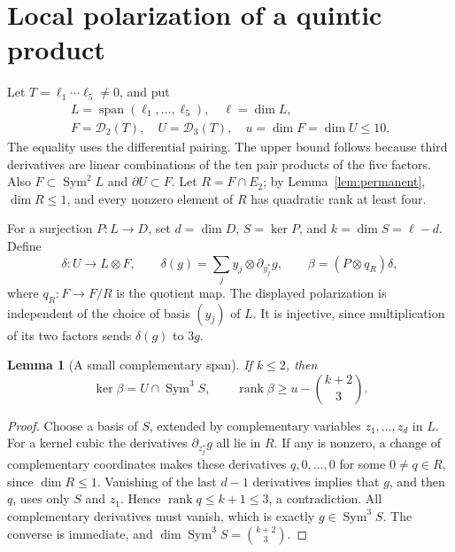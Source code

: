 \documentclass[11pt]{amsart}
\newtheorem{lemma}[theorem]{Lemma}
\theoremstyle{remark}
\numberwithin{equation}{section}
\newcommand{\Sym}{\operatorname{Sym}}
\newcommand{\Span}{\operatorname{span}}
\newcommand{\rank}{\operatorname{rank}}
\newcommand{\cD}{\mathcal D}
\newcommand{\dd}{\partial}
\begin{document}
\section{Local polarization of a quintic product}
Let \(T=\ell_1\cdots\ell_5\ne0\), and put
\[
 \begin{gathered}
 L=\Span(\ell_1,\ldots,\ell_5),\quad \ell=\dim L,\\
 F=\cD_2(T),\quad U=\cD_3(T),\quad u=\dim F=\dim U\le10.
 \end{gathered}
\]
The equality uses the differential pairing. The upper bound follows
because third derivatives are linear combinations of the ten pair
products of the five factors. Also \(F\subset\Sym^2L\) and
\(\dd U\subset F\). Let \(R=F\cap E_2\); by
Lemma~\ref{lem:permanent}, \(\dim R\le1\), and every nonzero element
of \(R\) has quadratic rank at least four.

For a surjection \(P:L\to D\), set \(d=\dim D\),
\(S=\ker P\), and \(k=\dim S=\ell-d\). Define
\[
 \delta:U\to L\otimes F,\qquad
 \delta(g)=\sum_j y_j\otimes\dd_{y_j^*}g,
 \qquad \beta=(P\otimes q_R)\delta,
\]
where \(q_R:F\to F/R\) is the quotient map. The displayed
polarization is independent of the choice of basis \((y_j)\) of \(L\).
It is injective, since multiplication of its two factors sends
\(\delta(g)\) to \(3g\).

\begin{lemma}[A small complementary span]\label{lem:kernel}
If \(k\le2\), then
\[
 \ker\beta=U\cap\Sym^3S,\qquad
 \rank\beta\ge u-\binom{k+2}{3}.
\]
\end{lemma}
\begin{proof}
Choose a basis of \(S\), extended by complementary variables
\(z_1,\ldots,z_d\) in \(L\). For a kernel cubic the derivatives
\(\dd_{z_j^*}g\) all lie in \(R\). If any is nonzero, a change of
complementary coordinates makes these derivatives \(q,0,\ldots,0\)
for some \(0\ne q\in R\), since \(\dim R\le1\). Vanishing of the
last \(d-1\) derivatives implies that \(g\), and then \(q\), uses
only \(S\) and \(z_1\). Hence \(\rank q\le k+1\le3\), a
contradiction. All complementary derivatives must vanish, which is
exactly \(g\in\Sym^3S\). The converse is immediate, and
\(\dim\Sym^3S=\binom{k+2}{3}\).
\end{proof}
\end{document}
